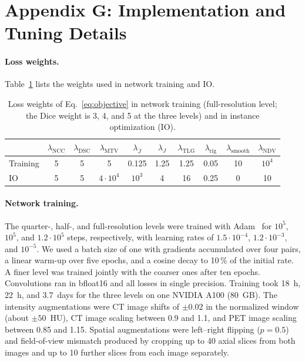 \FloatBarrier
\section{Appendix G: Implementation and Tuning Details}
\label{sect:app_implementation}

\paragraph{Loss weights.}
Table~\ref{tab:weights} lists the weights used in network training and IO.
\begin{table}[H]
\caption{\label{tab:weights}Loss weights of Eq.~\eqref{eq:objective} in network training (full-resolution level; the Dice weight is 3, 4, and 5 at the three levels) and in instance optimization (IO).}
\begin{center}
\begin{tabular}{lccccccccc}
\toprule
 & $\lambda_{\mathrm{NCC}}$ & $\lambda_{\mathrm{DSC}}$ & $\lambda_{\mathrm{MTV}}$ & $\lambda_{\overline{J}}$ & $\lambda_{J}$ & $\lambda_{\mathrm{TLG}}$ & $\lambda_{\mathrm{rig}}$ & $\lambda_{\mathrm{smooth}}$ & $\lambda_{\mathrm{NDV}}$ \\
\midrule
Training & 5 & 5 & 5 & 0.125 & 1.25 & 1.25 & 0.05 & 10 & $10^4$ \\
IO & 5 & 5 & $4\cdot10^4$ & $10^3$ & 4 & 16 & 0.25 & 0 & 10 \\
\bottomrule
\end{tabular}
\end{center}
\end{table}

\paragraph{Network training.}
The quarter-, half-, and full-resolution levels were trained with Adam~\cite{ref_adam} for $10^5$, $10^5$, and $1.2\cdot10^5$ steps, respectively, with learning rates of $1.5\cdot10^{-4}$, $1.2\cdot10^{-3}$, and $10^{-5}$.
We used a batch size of one with gradients accumulated over four pairs, a linear warm-up over five epochs, and a cosine decay to 10\,\% of the initial rate.
A finer level was trained jointly with the coarser ones after ten epochs.
Convolutions ran in bfloat16 and all losses in single precision.
Training took 18~h, 22~h, and 3.7~days for the three levels on one NVIDIA A100 (80~GB).
The intensity augmentations were CT image shifts of $\pm0.02$ in the normalized window (about $\pm50$~HU), CT image scaling between 0.9 and 1.1, and PET image scaling between 0.85 and 1.15.
Spatial augmentations were left--right flipping ($p=0.5$) and field-of-view mismatch produced by cropping up to 40 axial slices from both images and up to 10 further slices from each image separately.


